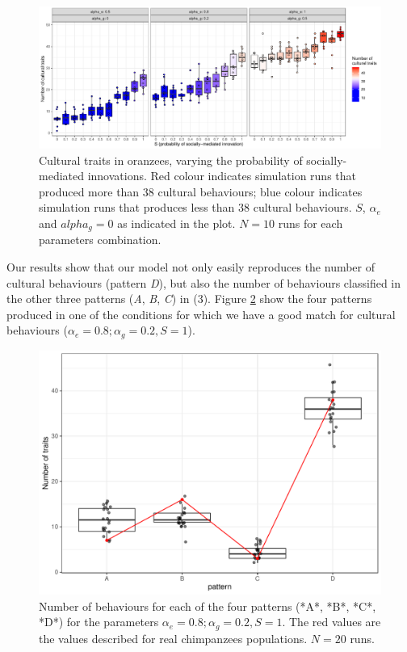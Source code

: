 \documentclass[9pt,twocolumn,twoside,]{pnas-new}
\begin{document}
\begin{figure}[h!]
\begin{center}
\includegraphics[width=17.8cm]{figures/figure_2.pdf}
\caption{Cultural traits in oranzees, varying the probability of socially-mediated innovations. Red colour indicates simulation runs that produced more than 38 cultural behaviours; blue colour indicates simulation runs that produces less than 38 cultural behaviours. $S$, $\alpha_e$ and $alpha_g=0$ as indicated in the plot. $N=10$ runs for each parameters combination.}
\label{Figure2}
\end{center}
\end{figure}

Our results show that our model not only easily reproduces the number of
cultural behaviours (pattern \emph{D}), but also the number of
behaviours classified in the other three patterns (\emph{A}, \emph{B},
\emph{C}) in (3). Figure \ref{Figure3} show the four patterns produced
in one of the conditions for which we have a good match for cultural
behaviours (\(\alpha_e=0.8;\alpha_g=0.2, S=1\)).

\begin{figure}[h!]
\begin{center}
\includegraphics[width=11.4cm]{figures/figure_3.pdf}
\caption{Number of behaviours for each of the four patterns (*A*, *B*, *C*, *D*) for the parameters $\alpha_e=0.8;\alpha_g=0.2,S=1$. The red values are the values described for real chimpanzees populations. $N=20$ runs.}
\label{Figure3}
\end{center}
\end{figure}
\end{document}
